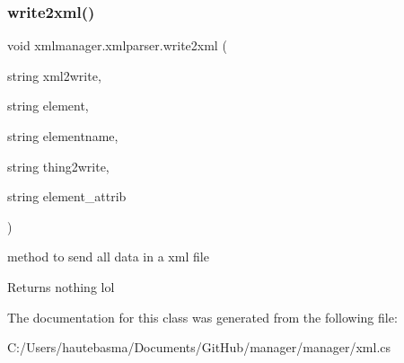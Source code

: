 \subsubsection{\texorpdfstring{write2xml()}{write2xml()}}
{\footnotesize\ttfamily void xmlmanager.\+xmlparser.\+write2xml (\begin{DoxyParamCaption}\item[{string}]{xml2write,  }\item[{string}]{element,  }\item[{string}]{elementname,  }\item[{string}]{thing2write,  }\item[{string}]{element\+\_\+attrib }\end{DoxyParamCaption})}



method to send all data in a xml file 

\begin{DoxyReturn}{Returns}
nothing lol
\end{DoxyReturn}


The documentation for this class was generated from the following file\+:\begin{DoxyCompactItemize}
\item 
C\+:/\+Users/hautebasma/\+Documents/\+Git\+Hub/manager/manager/xml.\+cs\end{DoxyCompactItemize}
